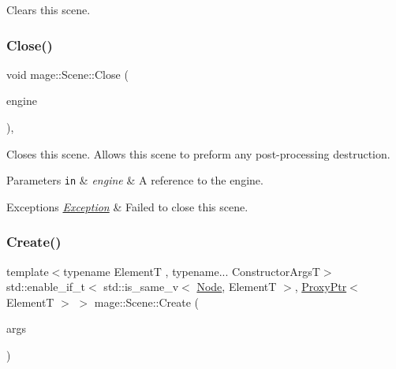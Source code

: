 Clears this scene. \hypertarget{classmage_1_1_scene_a6b90bb51fb3b5e965a42bfa57f992803}{}\label{classmage_1_1_scene_a6b90bb51fb3b5e965a42bfa57f992803} 
\subsubsection{\texorpdfstring{Close()}{Close()}}
{\footnotesize\ttfamily void mage\+::\+Scene\+::\+Close (\begin{DoxyParamCaption}\item[{\mbox{[}\mbox{[}maybe\+\_\+unused\mbox{]} \mbox{]} \hyperlink{classmage_1_1_engine}{Engine} \&}]{engine }\end{DoxyParamCaption})\hspace{0.3cm}{\ttfamily [private]}, {\ttfamily [virtual]}}

Closes this scene. Allows this scene to preform any post-\/processing destruction.


\begin{DoxyParams}[1]{Parameters}
\mbox{\tt in}  & {\em engine} & A reference to the engine. \\
\hline
\end{DoxyParams}

\begin{DoxyExceptions}{Exceptions}
{\em \hyperlink{classmage_1_1_exception}{Exception}} & Failed to close this scene. \\
\hline
\end{DoxyExceptions}
\hypertarget{classmage_1_1_scene_a8ce3f5152ad4b0935a08cc2f0a53383c}{}\label{classmage_1_1_scene_a8ce3f5152ad4b0935a08cc2f0a53383c} 
\subsubsection{\texorpdfstring{Create()}{Create()}\hspace{0.1cm}{\footnotesize\ttfamily [1/2]}}
{\footnotesize\ttfamily template$<$typename ElementT , typename... Constructor\+ArgsT$>$ \\
std\+::enable\+\_\+if\+\_\+t$<$ std\+::is\+\_\+same\+\_\+v$<$ \hyperlink{classmage_1_1_node}{Node}, ElementT $>$, \hyperlink{classmage_1_1_proxy_ptr}{Proxy\+Ptr}$<$ ElementT $>$ $>$ mage\+::\+Scene\+::\+Create (\begin{DoxyParamCaption}\item[{Constructor\+ArgsT \&\&...}]{args }\end{DoxyParamCaption})}

